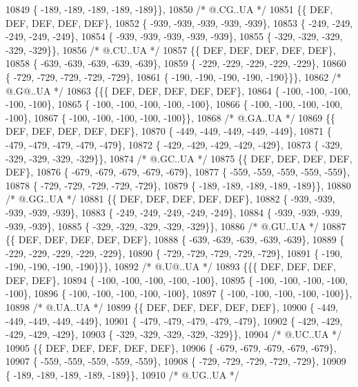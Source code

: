\begin{DoxyCode}
10849 \{ -189, -189, -189, -189, -189\}\},
10850 \textcolor{comment}{/*  @.CG..UA */}
10851 \{\{  DEF,  DEF,  DEF,  DEF,  DEF\},
10852 \{ -939, -939, -939, -939, -939\},
10853 \{ -249, -249, -249, -249, -249\},
10854 \{ -939, -939, -939, -939, -939\},
10855 \{ -329, -329, -329, -329, -329\}\},
10856 \textcolor{comment}{/*  @.CU..UA */}
10857 \{\{  DEF,  DEF,  DEF,  DEF,  DEF\},
10858 \{ -639, -639, -639, -639, -639\},
10859 \{ -229, -229, -229, -229, -229\},
10860 \{ -729, -729, -729, -729, -729\},
10861 \{ -190, -190, -190, -190, -190\}\}\},
10862 \textcolor{comment}{/*  @.G@..UA */}
10863 \{\{\{  DEF,  DEF,  DEF,  DEF,  DEF\},
10864 \{ -100, -100, -100, -100, -100\},
10865 \{ -100, -100, -100, -100, -100\},
10866 \{ -100, -100, -100, -100, -100\},
10867 \{ -100, -100, -100, -100, -100\}\},
10868 \textcolor{comment}{/*  @.GA..UA */}
10869 \{\{  DEF,  DEF,  DEF,  DEF,  DEF\},
10870 \{ -449, -449, -449, -449, -449\},
10871 \{ -479, -479, -479, -479, -479\},
10872 \{ -429, -429, -429, -429, -429\},
10873 \{ -329, -329, -329, -329, -329\}\},
10874 \textcolor{comment}{/*  @.GC..UA */}
10875 \{\{  DEF,  DEF,  DEF,  DEF,  DEF\},
10876 \{ -679, -679, -679, -679, -679\},
10877 \{ -559, -559, -559, -559, -559\},
10878 \{ -729, -729, -729, -729, -729\},
10879 \{ -189, -189, -189, -189, -189\}\},
10880 \textcolor{comment}{/*  @.GG..UA */}
10881 \{\{  DEF,  DEF,  DEF,  DEF,  DEF\},
10882 \{ -939, -939, -939, -939, -939\},
10883 \{ -249, -249, -249, -249, -249\},
10884 \{ -939, -939, -939, -939, -939\},
10885 \{ -329, -329, -329, -329, -329\}\},
10886 \textcolor{comment}{/*  @.GU..UA */}
10887 \{\{  DEF,  DEF,  DEF,  DEF,  DEF\},
10888 \{ -639, -639, -639, -639, -639\},
10889 \{ -229, -229, -229, -229, -229\},
10890 \{ -729, -729, -729, -729, -729\},
10891 \{ -190, -190, -190, -190, -190\}\}\},
10892 \textcolor{comment}{/*  @.U@..UA */}
10893 \{\{\{  DEF,  DEF,  DEF,  DEF,  DEF\},
10894 \{ -100, -100, -100, -100, -100\},
10895 \{ -100, -100, -100, -100, -100\},
10896 \{ -100, -100, -100, -100, -100\},
10897 \{ -100, -100, -100, -100, -100\}\},
10898 \textcolor{comment}{/*  @.UA..UA */}
10899 \{\{  DEF,  DEF,  DEF,  DEF,  DEF\},
10900 \{ -449, -449, -449, -449, -449\},
10901 \{ -479, -479, -479, -479, -479\},
10902 \{ -429, -429, -429, -429, -429\},
10903 \{ -329, -329, -329, -329, -329\}\},
10904 \textcolor{comment}{/*  @.UC..UA */}
10905 \{\{  DEF,  DEF,  DEF,  DEF,  DEF\},
10906 \{ -679, -679, -679, -679, -679\},
10907 \{ -559, -559, -559, -559, -559\},
10908 \{ -729, -729, -729, -729, -729\},
10909 \{ -189, -189, -189, -189, -189\}\},
10910 \textcolor{comment}{/*  @.UG..UA */}

\end{DoxyCode}
